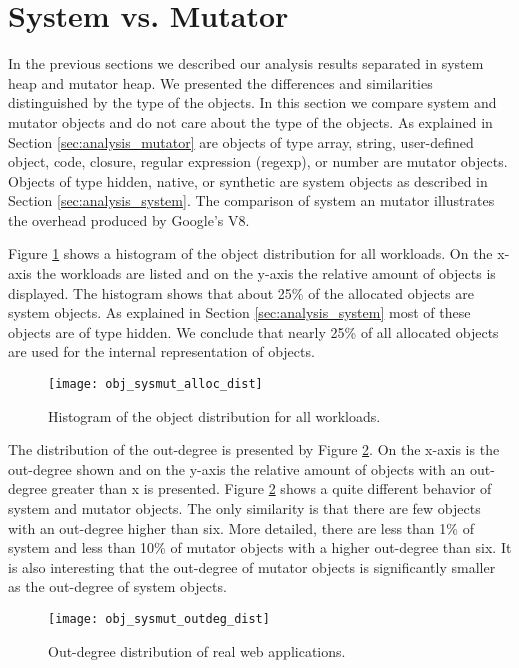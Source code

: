 
\section{System vs. Mutator} \label{sec:analysis_sys_vs_mut}

In the previous sections we described our analysis results separated in system heap and mutator heap. We presented the differences and similarities distinguished by the type of the objects. In this section we compare system and mutator objects and do not care about the type of the objects. As explained in Section \ref{sec:analysis_mutator} are objects of type array, string, user-defined object, code, closure, regular expression (regexp), or number are mutator objects. Objects of type hidden, native, or synthetic are system objects as described in Section \ref{sec:analysis_system}. The comparison of system an mutator illustrates the overhead produced by Google's V8. 

Figure \ref{fig:obj_sysmut_alloc_dist} shows a histogram of the object distribution for all workloads. On the x-axis the workloads are listed and on the y-axis the relative amount of objects is displayed. The histogram shows that about 25\% of the allocated objects are system objects. As explained in Section \ref{sec:analysis_system} most of these objects are of type hidden. We conclude that nearly 25\% of all allocated objects are used for the internal representation of objects.
\begin{figure}
	\centering
	\texttt{[image: obj\_sysmut\_alloc\_dist]}
	\caption{Histogram of the object distribution for all workloads.}
	\label{fig:obj_sysmut_alloc_dist}
\end{figure}

The distribution of the out-degree is presented by Figure \ref{fig:obj_sysmut_outdeg_dist}. On the x-axis is the out-degree shown and on the y-axis the relative amount of objects with an out-degree greater than x is presented. Figure \ref{fig:obj_sysmut_outdeg_dist} shows a quite different behavior of system and mutator objects. The only similarity is that there are few objects with an out-degree higher than six. More detailed, there are less than 1\% of system and less than 10\% of mutator objects with a higher out-degree than six. It is also interesting that the out-degree of mutator objects is significantly smaller as the out-degree of system objects.
\begin{figure}
	\centering
	\texttt{[image: obj\_sysmut\_outdeg\_dist]}
	\caption{Out-degree distribution of real web applications.}
	\label{fig:obj_sysmut_outdeg_dist}
\end{figure}

